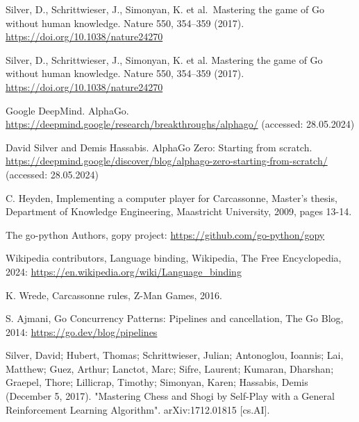 \documentclass[11pt,twocolumn]{article}
\begin{document}
\begin{thebibliography}{00}
Silver, D., Schrittwieser, J., Simonyan, K. et al.\ Mastering the game of Go without human knowledge. Nature 550, 354–359 (2017). \url{https://doi.org/10.1038/nature24270}

Silver, D., Schrittwieser, J., Simonyan, K. et al. Mastering the game of Go without human knowledge. Nature 550, 354–359 (2017). \url{https://doi.org/10.1038/nature24270}

Google DeepMind. AlphaGo. \url{https://deepmind.google/research/breakthroughs/alphago/} (accessed: 28.05.2024)

David Silver and Demis Hassabis. Alpha{G}o {Z}ero: {S}tarting from scratch. \url{https://deepmind.google/discover/blog/alphago-zero-starting-from-scratch/} (accessed: 28.05.2024)

C. Heyden, Implementing a computer player for Carcassonne, Master's thesis, Department of Knowledge Engineering, Maastricht University, 2009,
pages 13-14.

The go-python Authors, gopy project: \url{https://github.com/go-python/gopy}

Wikipedia contributors, Language binding, Wikipedia, The Free Encyclopedia, 2024:
\url{https://en.wikipedia.org/wiki/Language\_binding}

K. Wrede, Carcassonne rules, Z-Man Games, 2016.

S. Ajmani, Go Concurrency Patterns: Pipelines and cancellation, The Go Blog, 2014: \url{https://go.dev/blog/pipelines}

Silver, David; Hubert, Thomas; Schrittwieser, Julian; Antonoglou, Ioannis; Lai, Matthew; Guez, Arthur; Lanctot, Marc; Sifre, Laurent; Kumaran, Dharshan; Graepel, Thore; Lillicrap, Timothy; Simonyan, Karen; Hassabis, Demis (December 5, 2017). "Mastering Chess and Shogi by Self-Play with a General Reinforcement Learning Algorithm". arXiv:1712.01815 [cs.AI].
\end{thebibliography}
\end{document}
